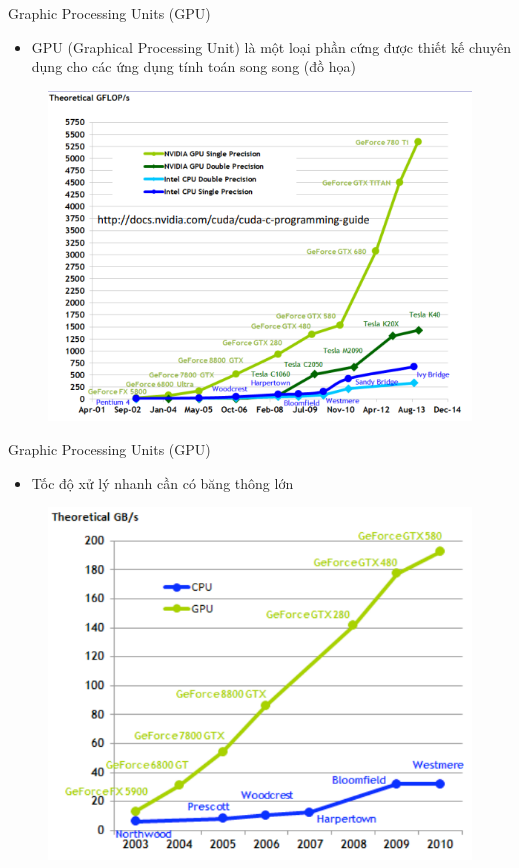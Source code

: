 \documentclass[10pt]{beamer}
\theoremstyle{remark}
\numberwithin{algocf}{section}
\numberwithin{equation}{section}
\numberwithin{dl}{section}
\numberwithin{figure}{section}
\begin{document}
\begin{frame}{Graphic Processing Units (GPU)}
    \begin{itemize}
        \item GPU (Graphical Processing Unit) là một loại phần cứng được thiết kế chuyên dụng cho các ứng dụng tính toán song song (đồ họa)
    \end{itemize}
    \begin{figure}[H]
        \centering
        \includegraphics[height=0.7\textheight]{figures/CUDA/GFLOP_Trend.png}
    \end{figure}
\end{frame}

\begin{frame}{Graphic Processing Units (GPU)}
    \begin{itemize}
        \item Tốc độ xử lý nhanh cần có băng thông lớn
    \end{itemize}
    \begin{figure}[H]
        \centering
        \includegraphics[height=0.7\textheight]{figures/CUDA/Bandwidth.png}
    \end{figure}
\end{frame}
\end{document}

